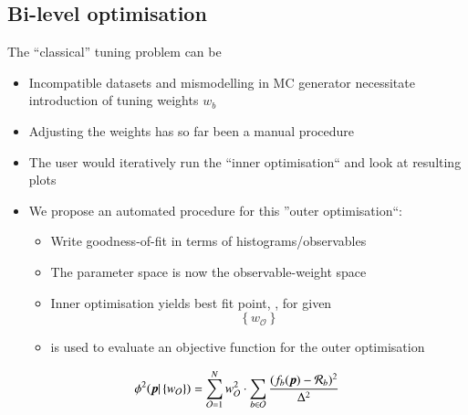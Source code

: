 
\subsection{Bi-level optimisation}
\label{sec-oopt}

The ``classical'' tuning problem can be
    \begin{itemize}
        \item Incompatible datasets and mismodelling in MC generator necessitate introduction of tuning weights $w_b$
        \item Adjusting the weights has so far been a manual procedure
        \item The user would iteratively run the ``inner optimisation`` and look at resulting plots
        \item We propose an automated procedure for this ''outer optimisation``:
            \begin{itemize}
                \item Write goodness-of-fit in terms of histograms/observables
                \item The parameter space is now the observable-weight space
                \item Inner optimisation yields best fit point, \phat, for given $$\left\{w_\mathcal{O}\right\}$$
                \item \phat is used to evaluate an objective function for the outer optimisation
            \end{itemize}
    \end{itemize}
$$
    \phi^2(\mbox{\boldmath $ p $}|\left\{w_\mathcal{O}\right\}) =
    \sum_{\mathcal{O}=1}^N w_\mathcal{O}^2 \cdot
    \sum_{b\in \mathcal{O}}
  \frac{ (f_b(\mbox{\boldmath $ p $}) - \mathcal{R}_b)^2 }{   \Delta^2}
$$

